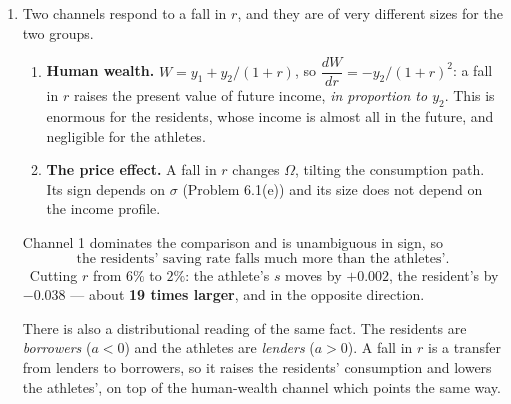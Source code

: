 \documentclass[12pt, letterpaper]{article}
\newcommand{\dd}[2]{\dfrac{d #1}{d #2}}
\begin{document}
\begin{tcolorbox}[evenbox,title={Problem 6.2 \quad Savings Rates for Different People}]
\begin{enumerate}
\smallskip
The residents' saving rate is \textbf{negative}, and this is the right prediction rather than
an artefact: first-year residents finance current consumption with student debt. The
athletes save heavily because they know their earning years are nearly over. Neither is a
statement about thrift; both are the same optimising rule applied to opposite income
profiles.

\smallskip
\emph{An important corollary for the economist holding the data.} A cross-sectional
regression of $c$ on $y$ in this sample will find a strong positive relationship and a
declining average propensity to consume, and will be tempted to call it a Keynesian
consumption function. Problem 6.4 shows exactly how that inference fails.

\item Two channels respond to a fall in $r$, and they are of very different sizes for the two
groups.

\begin{enumerate}[label=\textbf{Channel \arabic*.},leftmargin=2.7em,itemsep=4pt,topsep=3pt]
\item \textbf{Human wealth.} $W=y_1+y_2/(1+r)$, so
      $\dd{W}{r}=-y_2/(1+r)^2$: a fall in $r$ raises the present value of future income,
      \emph{in proportion to $y_2$}. This is enormous for the residents, whose income is
      almost all in the future, and negligible for the athletes.
\item \textbf{The price effect.} A fall in $r$ changes $\Omega$, tilting the consumption
      path. Its sign depends on $\sigma$ (Problem 6.1(e)) and its size does not depend on
      the income profile.
\end{enumerate}

Channel 1 dominates the comparison and is unambiguous in sign, so
\[
\boxed{\text{the residents' saving rate falls much more than the athletes'.}}
\]
\checkmark\ Cutting $r$ from $6\%$ to $2\%$: the athlete's $s$ moves by $+0.002$, the
resident's by $-0.038$ --- about \textbf{19 times larger}, and in the opposite direction.

\smallskip
There is also a distributional reading of the same fact. The residents are \emph{borrowers}
($a<0$) and the athletes are \emph{lenders} ($a>0$). A fall in $r$ is a transfer from lenders
to borrowers, so it raises the residents' consumption and lowers the athletes', on top of
the human-wealth channel which points the same way.

\end{enumerate}


\end{tcolorbox}
\end{document}

